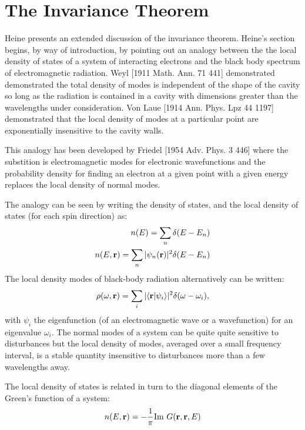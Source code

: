 %

\section{The Invariance Theorem}
\label{sec:invariance}
Heine presents an extended discussion of the invariance
theorem. Heine's section begins, by way of introduction, by pointing 
out an analogy between the the local density of states of a system of interacting
electrons and the black body spectrum of electromagnetic radiation.
Weyl [1911 Math. Ann. 71 441] demonstrated demonstrated the total density
of modes is independent of the shape of the cavity so long as the
radiation is contained in a cavity with dimensions greater than the wavelengths
under consideration. Von Laue [1914 Ann. Phys. Lpz 44 1197] demonstrated that the local density of modes at 
a particular point are exponentially insensitive to the cavity walls.

This analogy has been developed by Friedel [1954 Adv. Phys. 3 446] where
the substition is electromagnetic modes for electronic wavefunctions and
the probability density for finding an electron at a given point
with a given energy replaces the local density of normal modes\cite{annett94}.

The analogy can be seen by writing the density of states,
and the local density of states (for each spin direction) as:
%
\begin{eqnarray}
n(E) = \sum_{n}\delta(E-E_{n}) \\
n(E,{\bf r}) = \sum_{n} |\psi_{n}({\bf r})|^{2}\delta(E-E_{n})
\end{eqnarray}
%
The local density modes of black-body radiation alternatively can be written:
%
\begin{equation}
\rho(\omega,{\bf r})= \sum_{i} |\langle {\bf r}| \psi_{i}\rangle|^{2}\delta(\omega-\omega_{i}),
\end{equation}
%
with $\psi_{i}$ the eigenfunction (of an electromagnetic wave or a wavefunction) for an eigenvalue $\omega_{i}$.\cite{annett94}
The normal modes of a system can be quite quite sensitive to disturbances but the 
local density of modes, averaged over a small frequency interval, is a stable quantity 
insensitive to disturbances more than a few wavelengths away.

The local density of states is related in turn to the diagonal elements of
the Green's function of a system:
%
\begin{equation}
n(E,{\bf r}) = -\frac{1}{\pi}{\rm Im}~G({\bf r},{\bf r},E)
\end{equation}
%

